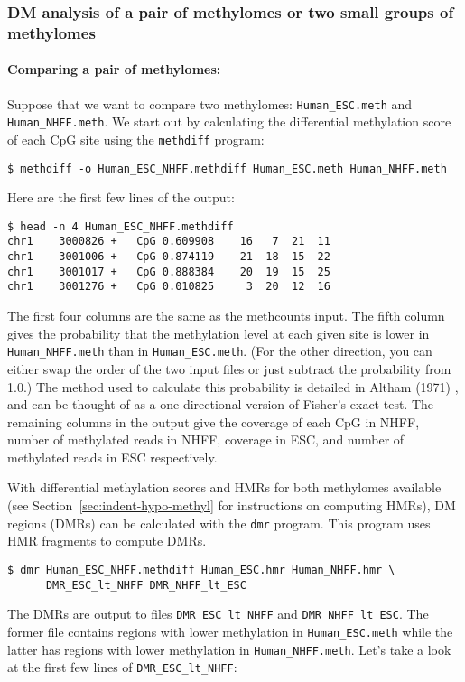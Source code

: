 \documentclass[10pt]{article}
\newcommand{\prog}[1]{\texttt{#1}}
\newcommand{\fn}[1]{\texttt{#1}}
\begin{document}
\subsubsection{DM analysis of a pair of methylomes or two small groups of 
			   methylomes}

\paragraph{Comparing a pair of methylomes:} 
Suppose that we want to compare two methylomes: {\tt Human\_ESC.meth} and 
{\tt Human\_NHFF.meth}. We start out by calculating the differential 
methylation score of each CpG site using the \prog{methdiff} program:
{\small{%
\begin{verbatim}
$ methdiff -o Human_ESC_NHFF.methdiff Human_ESC.meth Human_NHFF.meth
\end{verbatim}%
}}
Here are the first few lines of the output:
{\small{%
\begin{verbatim}
$ head -n 4 Human_ESC_NHFF.methdiff
chr1	3000826	+	CpG	0.609908	16	 7	21	11
chr1	3001006	+	CpG	0.874119	21	18	15	22
chr1	3001017	+	CpG	0.888384	20	19	15	25
chr1	3001276	+	CpG	0.010825	 3	20	12	16
\end{verbatim}%
}}

The first four columns are the same as the methcounts input. The fifth 
column gives the probability that the methylation level at each given 
site is lower in \fn{Human\_NHFF.meth} than in \fn{Human\_ESC.meth}. 
(For the other direction, you can either swap the order of the two 
input files or just subtract the probability from 1.0.) The method used 
to calculate this probability is detailed in Altham (1971) 
\cite{altham1969exact}, and can be thought of as a one-directional 
version of Fisher's exact test.  The remaining columns in the output 
give the coverage of each CpG in NHFF, number of methylated reads in 
NHFF, coverage in ESC, and number of methylated reads in ESC 
respectively.

With differential methylation scores and HMRs for both methylomes 
available (see Section~\ref{sec:indent-hypo-methyl} for instructions 
on computing HMRs), DM regions (DMRs) can be calculated with the 
\prog{dmr} program. This program uses HMR fragments to compute 
DMRs.

{\small{%
\begin{verbatim}
$ dmr Human_ESC_NHFF.methdiff Human_ESC.hmr Human_NHFF.hmr \
      DMR_ESC_lt_NHFF DMR_NHFF_lt_ESC
\end{verbatim}%
}}
The DMRs are output to files {\tt DMR\_ESC\_lt\_NHFF} and 
{\tt DMR\_NHFF\_lt\_ESC}. The former file contains regions with 
lower methylation in {\tt Human\_ESC.meth} while the latter  has 
regions with lower methylation in {\tt Human\_NHFF.meth}. Let's take 
a look at the first few lines of {\tt DMR\_ESC\_lt\_NHFF}:
\end{document}
